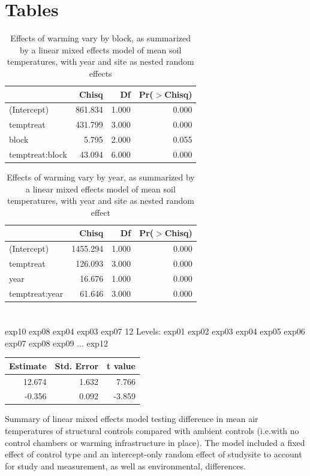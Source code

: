 \documentclass{article}
\begin{document}
\section* {Tables}
\par
\begin{table}[ht]
\centering
\begin{tabular}{lrrr}
  \hline
 & Chisq & Df & Pr($>$Chisq) \\ 
  \hline
(Intercept) & 861.834 & 1.000 & 0.000 \\ 
  temptreat & 431.799 & 3.000 & 0.000 \\ 
  block & 5.795 & 2.000 & 0.055 \\ 
  temptreat:block & 43.094 & 6.000 & 0.000 \\ 
   \hline
\end{tabular}
\caption{Effects of warming vary by block, as summarized by a linear mixed effects model of mean soil temperatures, with year and site as nested random effects} 
\end{table}\par
\begin{table}[ht]
\centering
\begin{tabular}{lrrr}
  \hline
 & Chisq & Df & Pr($>$Chisq) \\ 
  \hline
(Intercept) & 1455.294 & 1.000 & 0.000 \\ 
  temptreat & 126.093 & 3.000 & 0.000 \\ 
  year & 16.676 & 1.000 & 0.000 \\ 
  temptreat:year & 61.646 & 3.000 & 0.000 \\ 
   \hline
\end{tabular}
\caption{Effects of warming vary by year, as summarized by a linear mixed effects model of mean soil temperatures, with year and site as nested random effect} 
\end{table}\section* {}
\par
[1] exp10 exp08 exp04 exp03 exp07
12 Levels: exp01 exp02 exp03 exp04 exp05 exp06 exp07 exp08 exp09 ... exp12\par
\begin{tabular}{rrr}
  \hline
Estimate & Std. Error & t value \\ 
  \hline
12.674 & 1.632 & 7.766 \\ 
  -0.356 & 0.092 & -3.859 \\ 
   \hline
\end{tabular}\par Summary of linear mixed effects model testing difference in mean air temperatures of structural controls compared with ambient controls (i.e.with no control chambers or warming infrastructure in place). The model included a fixed effect of control type and an intercept-only random effect of studysite to account for study and measurement, as well as environmental, differences.
\end{document}
